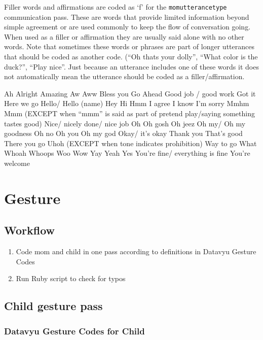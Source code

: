 \documentclass[
  12pt,
]{book}
\providecommand{\tightlist}{%
  \setlength{\itemsep}{0pt}\setlength{\parskip}{0pt}}
\begin{document}
Filler words and affirmations are coded as `f' for the \texttt{momutterancetype} communication pass. These are words that provide limited information beyond simple agreement or are used commonly to keep the flow of conversation going. When used as a filler or affirmation they are usually said alone with no other words. Note that sometimes these words or phrases are part of longer utterances that should be coded as another code. (``Oh thats your dolly'', ``What color is the duck?'', ``Play nice''. Just because an utterance includes one of these words it does not automatically mean the utterance should be coded as a filler/affirmation.

Ah
Alright
Amazing
Aw
Aww
Bless you
Go Ahead
Good job / good work
Got it
Here we go
Hello/ Hello (name)
Hey
Hi
Hmm
I agree
I know
I'm sorry
Mmhm
Mmm (EXCEPT when ``mmm'' is said as part of pretend play/saying something tastes good)
Nice/ nicely done/ nice job
Oh
Oh gosh
Oh jeez
Oh my/ Oh my goodness
Oh no
Oh you
Oh my god
Okay/ it's okay
Thank you
That's good
There you go
Uhoh (EXCEPT when tone indicates prohibition)
Way to go
What
Whoah
Whoops
Woo
Wow
Yay
Yeah
Yes
You're fine/ everything is fine
You're welcome

\hypertarget{gesture}{%
\chapter{Gesture}\label{gesture}}

\hypertarget{workflow-1}{%
\section{Workflow}\label{workflow-1}}

\begin{enumerate}
\def\labelenumi{\arabic{enumi}.}
\tightlist
\item
  Code mom and child in one pass according to definitions in Datavyu Gesture Codes
\item
  Run Ruby script to check for typos
\end{enumerate}

\hypertarget{child-gesture-pass}{%
\section{Child gesture pass}\label{child-gesture-pass}}

\hypertarget{datavyu-gesture-codes-for-child}{%
\subsection*{Datavyu Gesture Codes for Child}\label{datavyu-gesture-codes-for-child}}
\end{document}
